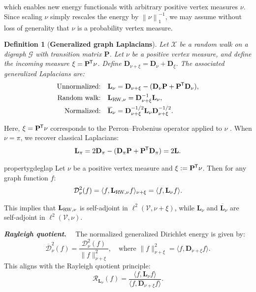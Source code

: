 \documentclass[10pt]{article} %
\def\rmD{{\mathbf{D}}}
\def\rmL{{\mathbf{L}}}
\def\rmP{{\mathbf{P}}}
\def\gV{{\mathcal{V}}}
\newcommand{\norm}[1]{\left\lVert#1\right\rVert}
\newtheorem{definition}{Definition}[section]
\newcommand{\D}[2]{\mathcal{D}^2_{#1}(#2)}
\newcommand{\Dnorm}[2]{\overline{\mathcal{D}}_{#1}^2(#2)}
\renewcommand*{\top}{{\mkern-1.4mu\mathsf{T}}}
\newcommand{\inlinetitle}[2]{\noindent\textbf{\textit{#1}{#2}}~~}
\begin{document}
which enables new energy functionals %
with arbitrary positive vertex measures $\nu$.
Since scaling $\nu$ simply rescales the energy by $\norm{\nu}_1^{-1}$, we may assume without loss of generality that $\nu$ is a probability vertex measure.
%
\begin{definition}[\textbf{Generalized graph Laplacians}] \label{def:gen_lap}
  Let $\mathcal{X}$ be a random walk on a digraph $\mathcal{G}$ with transition matrix $\rmP$. Let $\nu$ be a positive vertex measure, and define the incoming measure $\xi = \rmP^\top \nu$. Define $\rmD_{\nu+\xi} = \rmD_\nu + \rmD_\xi$. The associated generalized Laplacians are:
  \begin{align}
      \text{Unnormalized:} &\quad \rmL_\nu = \rmD_{\nu+\xi} - (\rmD_\nu \rmP + \rmP^\top \rmD_\nu), \label{unnorm_glap} \\
      \text{Random walk:} &\quad \rmL_{\textnormal{RW},\nu} = \rmD_{\nu+\xi}^{-1} \rmL_\nu, \label{gen_rw_lap} \\
      \text{Normalized:} &\quad \overline{\rmL}_\nu = \rmD_{\nu+\xi}^{-1/2} \rmL_\nu \rmD_{\nu+\xi}^{-1/2}.
  \end{align}
\end{definition}
%
Here, $\xi = \rmP^\top \nu$ corresponds to the Perron--Frobenius operator applied to $\nu$ \citep{Ding2009,klus2023transfer,klus2023koopman}. When $\nu = \pi$, %
we recover classical Laplacians:
\begin{equation}
  \rmL_\pi = 2\rmD_\pi - (\rmD_\pi \rmP + \rmP^\top \rmD_\pi) = 2\rmL.
\end{equation}
\vspace{-1.5em}
\begin{restatable}[]{property}{gdeglap}
  \label{gde_glap}
  Let $\nu$ be a positive vertex measure and $\xi := \rmP^\top \nu$. Then for any graph function $f$:
  \begin{equation}
    \D{\nu}{f} = \langle f, \rmL_{\textnormal{RW},\nu} f \rangle_{\nu+\xi} = \langle f, \rmL_\nu f \rangle.
  \end{equation}
\end{restatable}
%
This implies that $\rmL_{\textnormal{RW},\nu}$ is self-adjoint in $\ell^2(\gV, \nu + \xi)$, while $\rmL_\nu$ and $\overline{\rmL}_\nu$ are self-adjoint in $\ell^2(\gV, \nu)$.

\inlinetitle{Rayleigh quotient}{.}%
The normalized generalized Dirichlet energy is given by:
\begin{equation}
  \label{rayleigh_ratio}
  \Dnorm{\nu}{f} = \frac{\D{\nu}{f}}{\|f\|_{\nu + \xi}^2}, \quad \text{where } \|f\|_{\nu + \xi}^2 = \langle f, \rmD_{\nu + \xi} f \rangle.
\end{equation}
This aligns with the Rayleigh quotient principle:
\begin{equation}
  \mathcal{R}_{\rmL_\nu}(f) = \frac{\langle f, \rmL_\nu f \rangle}{\langle f, \rmD_{\nu + \xi} f \rangle}.
\end{equation}
\end{document}
